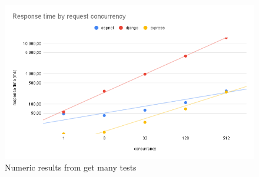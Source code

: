\begin{figure}[H]
    \includegraphics[width=\columnwidth]{figures/pictures/resultsGetMany.png}
    \caption{Numeric results from get many tests}
    \label{fig:resultsGetMany}
\end{figure}
